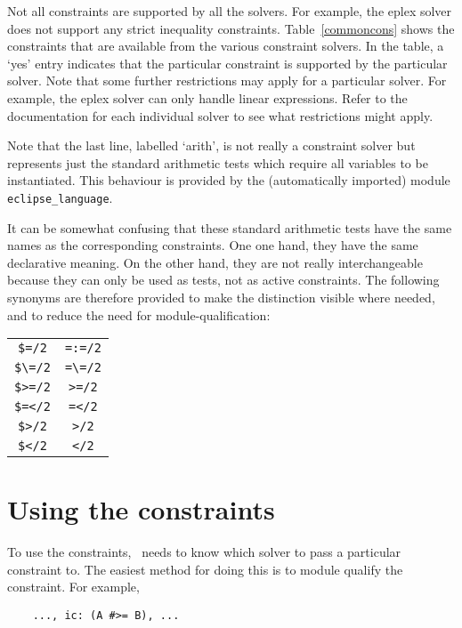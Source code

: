 Not all constraints are supported by all the solvers. For example, the
eplex solver does not support any strict inequality constraints.
Table~\ref{commoncons} shows the constraints that are available
from the various constraint solvers.
In the table, a `yes' entry indicates that the
particular constraint is supported by the particular solver. Note
that some further restrictions may apply for a particular solver. For
example, the eplex solver can only handle linear expressions. Refer
to the documentation for each individual solver to see what restrictions
might apply.

Note that the last line, labelled `arith', is not really a constraint
solver but represents just the standard arithmetic tests which require
all variables to be instantiated. This behaviour is provided by the
(automatically imported) module {\tt eclipse_language}.

It can be somewhat confusing that these standard arithmetic tests have the same
names as the corresponding constraints. One one hand, they have the same declarative
meaning. On the other hand, they are not really interchangeable because they
can only be used as tests, not as active constraints. 
The following synonyms are therefore provided to make the distinction visible
where needed, and to reduce the need for module-qualification:

\begin{center}
\begin{tabular}{|c|c|}
\hline
\verb'$=/2'  & \verb'=:=/2' \\
\verb'$\=/2' & \verb'=\=/2' \\
\verb'$>=/2' & \verb'>=/2'  \\
\verb'$=</2' & \verb'=</2'  \\
\verb'$>/2'  & \verb'>/2'  \\
\verb'$</2'  & \verb'</2'  \\
\hline
\end{tabular}
\end{center}


\section{Using the constraints}

To use the constraints, \eclipse\ needs to know which solver to pass a
particular constraint to. The easiest method for doing this is to module
qualify the constraint. For example,

\begin{verbatim}
    ..., ic: (A #>= B), ...
\end{verbatim}

